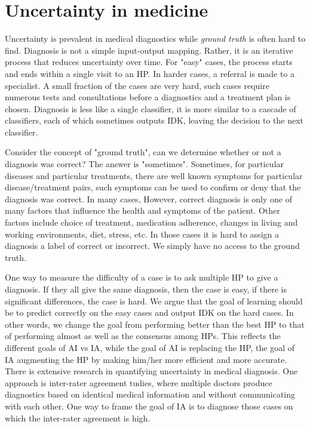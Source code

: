 \documentclass[11pt]{pnas-new}
\begin{document}
\section{Uncertainty in medicine}

Uncertainty is prevalent in medical diagnostics 
while  {\em ground truth} is often hard to find.
Diagnosis is not a simple input-output mapping. Rather, it is an iterative process that reduces uncertainty over time. For "easy" cases, the process starts and ends within a single visit to an HP. 
In harder cases, a referral is made to a specialist.  A small fraction of the cases are very hard, such cases require numerous  tests and consultations before a diagnostics and a treatment plan is chosen. Diagnosis is less like a single 
classifier, it is more similar to a cascade of classifiers, each of which sometimes outputs IDK, leaving the decision to the next classifier.

Consider the concept of "ground truth", can we determine whether or not a diagnosis was correct? The answer is "sometimes".
Sometimes, for particular diseases and particular treatments, there are well known symptoms for particular disease/treatment pairs, such symptoms can be used to confirm or deny that the diagnosis was correct. 
In many cases, However, correct diagnosis is only one of many 
factors that influence the health and symptoms of the patient. Other factors include choice of treatment, medication adherence, changes in living and working environments, diet, stress, etc. In those cases it is hard to assign a diagnosis a label of correct or incorrect. We simply have no access to the ground truth.

One way to measure the difficulty of a case is to ask multiple HP to give a diagnosis. If they all give the same diagnosis, then the case is easy, if there is significant differences, the case is hard.  
We argue that the goal of learning should be to predict correctly on the easy cases and output IDK on the hard cases. In other words, we change the goal from performing better than the best HP to that of performing almost as well as the consensus among HPs. 
%
This reflects the different goals of AI vs IA, while the goal of AI is replacing the HP, the goal of IA augmenting the HP
by making him/her more efficient and more accurate.
There is extensive research in quantifying uncertainty in medical diagnosis. One approach is inter-rater agreement tudies, 
where multiple doctors produce diagnostics based on identical medical information and without communicating with each other. 
One way to frame the goal of IA is to diagnose those cases on which the inter-rater agreement is high. 
\end{document}
